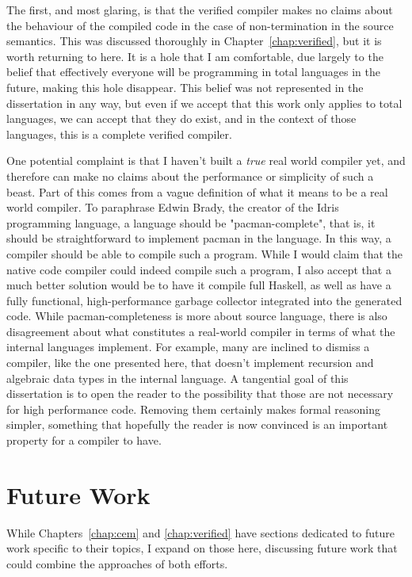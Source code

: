 The first, and most glaring, is that the verified compiler makes no claims about
the behaviour of the compiled code in the case of non-termination in the source
semantics. This was discussed thoroughly in Chapter~\ref{chap:verified}, but
it is worth returning to here. It is a hole that I am comfortable, due largely
to the belief that effectively everyone will be programming in total languages
in the future, making this hole disappear. This belief was not represented in
the dissertation in any way, but even if we accept that this work only applies
to total languages, we can accept that they do exist, and in the context of
those languages, this is a complete verified compiler. 

One potential complaint is that I haven't built a \emph{true} real world
compiler yet, and therefore can make no claims about the performance or
simplicity of such a beast. Part of this comes from a vague definition of what
it means to be a real world compiler. To paraphrase Edwin Brady, the creator of
the Idris programming language, a language should be "pacman-complete", that is,
it should be straightforward to implement pacman in the language. In this way, a
compiler should be able to compile such a program.  While I would claim that the
native code compiler could indeed compile such a program, I also accept that a
much better solution would be to have it compile full Haskell, as well as have a
fully functional, high-performance garbage collector integrated into the
generated code. While pacman-completeness is more about source language, there
is also disagreement about what constitutes a real-world compiler in terms of
what the internal languages implement. For example, many are inclined to dismiss
a compiler, like the one presented here, that doesn't implement recursion and
algebraic data types in the internal language. A tangential goal of this
dissertation is to open the reader to the possibility that those are not
necessary for high performance code. Removing them certainly makes formal
reasoning simpler, something that hopefully the reader is now convinced is an
important property for a compiler to have.  

\section{Future Work}\label{sec:future}

While Chapters~\ref{chap:cem} and \ref{chap:verified} have sections dedicated to
future work specific to their topics, I expand on those here, discussing future
work that could combine the approaches of both efforts. 

